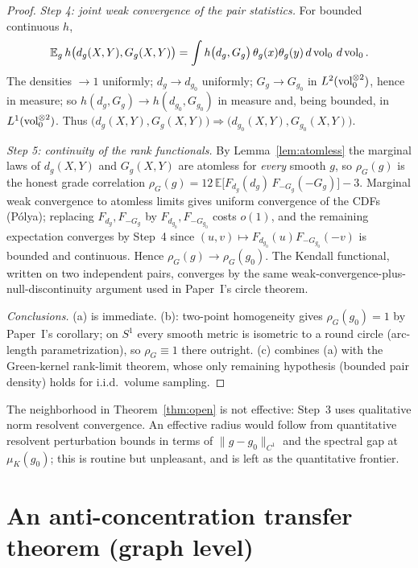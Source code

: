 \begin{proof}
\emph{Step 4: joint weak convergence of the pair statistics.} For bounded continuous
$h$,
\[
\mathbb E_g\,h\bigl(d_g(X,Y),G_g(X,Y)\bigr)
=\int h\bigl(d_g,G_g\bigr)\,\theta_g(x)\theta_g(y)\,d\operatorname{vol}_0\,d\operatorname{vol}_0 .
\]
The densities $\to1$ uniformly; $d_g\to d_{g_0}$ uniformly; $G_g\to G_{g_0}$ in
$L^2(\operatorname{vol}_0^{\otimes2})$, hence in measure; so
$h(d_g,G_g)\to h(d_{g_0},G_{g_0})$ in measure and, being bounded, in $L^1(\operatorname{vol}_0^{\otimes2})$.
Thus
$\bigl(d_g(X,Y),G_g(X,Y)\bigr)\Rightarrow\bigl(d_{g_0}(X,Y),G_{g_0}(X,Y)\bigr)$.

\emph{Step 5: continuity of the rank functionals.} By Lemma~\ref{lem:atomless} the
marginal laws of $d_g(X,Y)$ and $G_g(X,Y)$ are atomless for \emph{every} smooth $g$,
so $\rho_G(g)$ is the honest grade correlation
$\rho_G(g)=12\,\mathbb E\bigl[F_{d_g}(d_g)\,F_{-G_g}(-G_g)\bigr]-3$. Marginal weak
convergence to atomless limits gives uniform convergence of the CDFs (P\'olya);
replacing $F_{d_g},F_{-G_g}$ by $F_{d_{g_0}},F_{-G_{g_0}}$ costs $o(1)$, and the
remaining expectation converges by Step~4 since
$(u,v)\mapsto F_{d_{g_0}}(u)F_{-G_{g_0}}(-v)$ is bounded and continuous. Hence
$\rho_G(g)\to\rho_G(g_0)$. The Kendall functional, written on two independent pairs,
converges by the same weak-convergence-plus-null-discontinuity argument used in
Paper~I's circle theorem.

\emph{Conclusions.} (a) is immediate. (b): two-point homogeneity gives
$\rho_G(g_0)=1$ by Paper~I's corollary; on $S^1$ every smooth metric is isometric to a
round circle (arc-length parametrization), so $\rho_G\equiv1$ there outright. (c)
combines (a) with the Green-kernel rank-limit theorem, whose only remaining hypothesis
(bounded pair density) holds for i.i.d.\ volume sampling.
\end{proof}

\begin{remark}
The neighborhood in Theorem~\ref{thm:open} is not effective: Step~3 uses qualitative
norm resolvent convergence. An effective radius would follow from quantitative
resolvent perturbation bounds in terms of $\lVert g-g_0\rVert_{C^1}$ and the spectral
gap at $\mu_K(g_0)$; this is routine but unpleasant, and is left as the quantitative
frontier.
\end{remark}

\section{An anti-concentration transfer theorem (graph level)}

